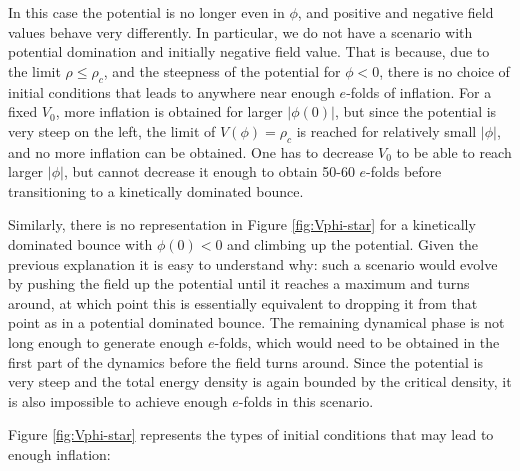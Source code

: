 \documentclass[aps,prd,11pt,showkeys,nofootinbib]{revtex4-2}
\begin{document}
In this case the potential is no longer even in $\phi$, and positive and negative field values behave very differently. In particular, we do not have a scenario with potential domination and initially negative field value. That is because, due to the limit $\rho \leq \rho_c$, and the steepness of the potential for $\phi<0$, there is no choice of initial conditions that leads to anywhere near enough $e$-folds of inflation. For a fixed $V_0$, more inflation is obtained for larger $|\phi(0)|$, but since the potential is very steep on the left, the limit of $V(\phi) = \rho_c$ is reached for relatively small $|\phi|$, and no more inflation can be obtained. One has to decrease $V_0$ to be able to reach larger $|\phi|$, but cannot decrease it enough to obtain 50-60 $e$-folds before transitioning to a kinetically dominated bounce.

Similarly, there is no representation in Figure \ref{fig:Vphi-star} for a kinetically dominated bounce with $\phi(0) < 0$ and climbing up the potential. Given the previous explanation it is easy to understand why: such a scenario would evolve by pushing the field up the potential until it reaches a maximum and turns around, at which point this is essentially equivalent to dropping it from that point as in a potential dominated bounce. The remaining dynamical phase is not long enough to generate enough $e$-folds, which would need to be obtained in the first part of the dynamics before the field turns around. Since the potential is very steep and the total energy density is again bounded by the critical density, it is also impossible to achieve enough $e$-folds in this scenario.

Figure \ref{fig:Vphi-star} represents the types of initial conditions that may lead to enough inflation:
\end{document}
